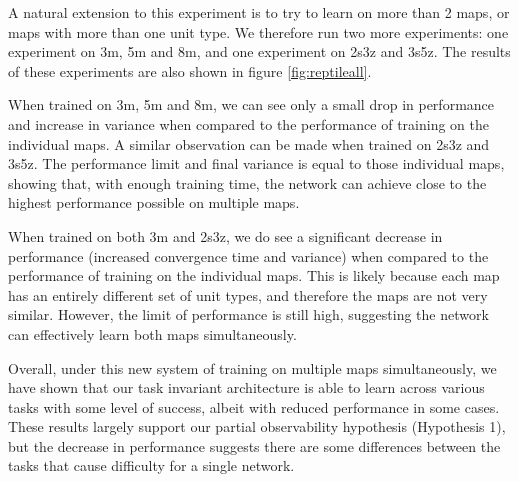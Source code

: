 A natural extension to this experiment is to try to learn on more than 2 maps, or maps with more than one unit type. We therefore run two more experiments: one experiment on 3m, 5m and 8m, and one experiment on 2s3z and 3s5z. The results of these experiments are also shown in figure \ref{fig:reptileall}.



When trained on 3m, 5m and 8m, we can see only a small drop in performance and increase in variance when compared to the performance of training on the individual maps. A similar observation can be made when trained on 2s3z and 3s5z. The performance limit and final variance is equal to those individual maps, showing that, with enough training time, the network can achieve close to the highest performance possible on multiple maps.

When trained on both 3m and 2s3z, we do see a significant decrease in performance (increased convergence time and variance) when compared to the performance of training on the individual maps. This is likely because each map has an entirely different set of unit types, and therefore the maps are not very similar. However, the limit of performance is still high, suggesting the network can effectively learn both maps simultaneously.

Overall, under this new system of training on multiple maps simultaneously, we have shown that our task invariant architecture is able to learn across various tasks with some level of success, albeit with reduced performance in some cases. These results largely support our partial observability hypothesis (Hypothesis 1), but the decrease in performance suggests there are some differences between the tasks that cause difficulty for a single network.

